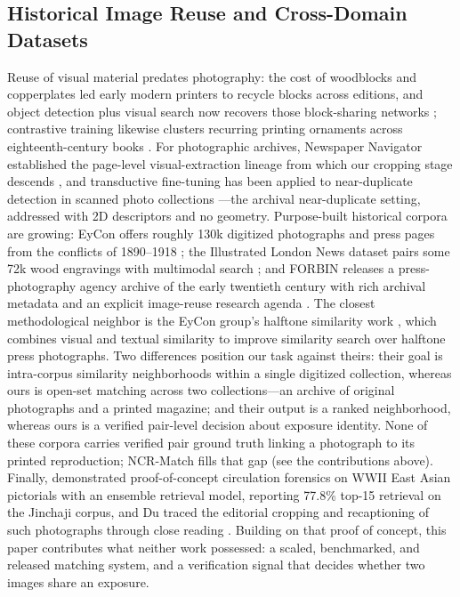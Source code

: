\documentclass[letterpaper]{article} %
\begin{document}
\subsection{Historical Image Reuse and Cross-Domain Datasets}
Reuse of visual material predates photography: the cost of woodblocks and
copperplates led early modern printers to recycle blocks across editions, and
object detection plus visual search now recovers those block-sharing networks
\cite{lang2025finetuning,dutta2021chapbooks}; contrastive training likewise
clusters recurring printing ornaments across eighteenth-century books
\cite{wang2025ornamentreuse}. For photographic archives, Newspaper Navigator
established the page-level visual-extraction lineage from which our cropping
stage descends \cite{lee2020newspaper}, and transductive fine-tuning has been
applied to near-duplicate detection in scanned photo collections
\cite{net2023transductive}---the archival near-duplicate setting, addressed
with 2D descriptors and no geometry. Purpose-built historical corpora are
growing: EyCon offers roughly 130k digitized photographs and press pages from
the conflicts of 1890--1918 \cite{giardinetti2024eycon}; the Illustrated
London News dataset pairs some 72k wood engravings with multimodal search
\cite{smits2025iln}; and FORBIN releases a press-photography agency archive of
the early twentieth century with rich archival metadata and an explicit
image-reuse research agenda \cite{chelali2026forbin}. The closest
methodological neighbor is the EyCon group's halftone similarity work
\cite{aissi2025halftone}, which combines visual and textual similarity to
improve similarity search over halftone press photographs. Two differences
position our task against theirs: their goal is intra-corpus similarity
neighborhoods within a single digitized collection, whereas ours is open-set
matching across two collections---an archive of original photographs and a
printed magazine; and their output is a ranked neighborhood, whereas ours is a
verified pair-level decision about exposure identity. None of these corpora
carries verified pair ground truth linking a photograph to its printed
reproduction; NCR-Match fills that gap (see the contributions above). Finally,
\citet{du2024probing} demonstrated proof-of-concept circulation forensics on
WWII East Asian pictorials with an ensemble retrieval model, reporting 77.8\%
top-15 retrieval on the Jinchaji corpus, and Du traced the editorial cropping
and recaptioning of such photographs through close reading
\cite{du2025metaphor}. Building on that proof of concept, this paper
contributes what neither work possessed: a scaled, benchmarked, and released
matching system, and a verification signal that decides whether two images
share an exposure.
\end{document}
